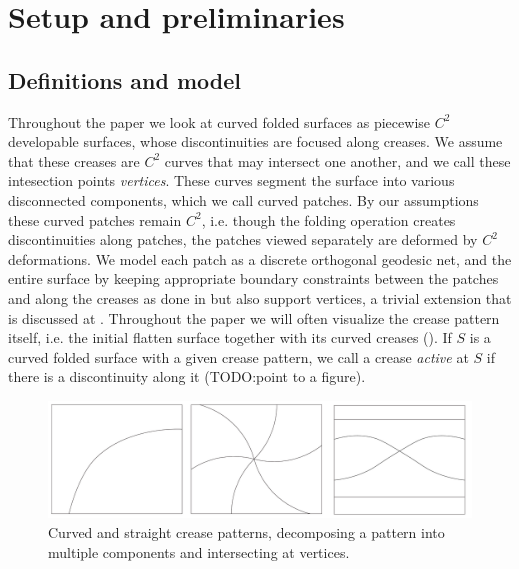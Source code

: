 \section{Setup and preliminaries} \label{sec:pre}
\subsection{Definitions and model}
Throughout the paper we look at curved folded surfaces as piecewise $C^2$ developable surfaces, whose discontinuities are focused along creases. We assume that these creases are $C^2$ curves that may intersect one another, and we call these intesection points \textit{vertices}. These curves segment the surface into various disconnected components, which we call curved patches. By our assumptions these curved patches remain $C^2$, i.e. though the folding operation creates discontinuities along patches, the patches viewed separately are deformed by $C^2$ deformations. We model each patch as a discrete orthogonal geodesic net, and the entire surface by keeping appropriate boundary constraints between the patches and along the creases as done in \cite{rabi2018shape} but also support vertices, a trivial extension that is discussed at . Throughout the paper we will often visualize the crease pattern itself, i.e. the initial flatten surface together with its curved creases (). If $S$ is a curved folded surface with a given crease pattern, we call a crease \textit{active} at $S$ if there is a discontinuity along it (TODO:point to a figure).

\begin{figure} [h]
	\centering
	\includegraphics[width=\linewidth]{figures/crease_patterns}
	\caption{Curved and straight crease patterns, decomposing a pattern into multiple components and intersecting at vertices.}
	\label{fig:crease_pattern}
\end{figure}

